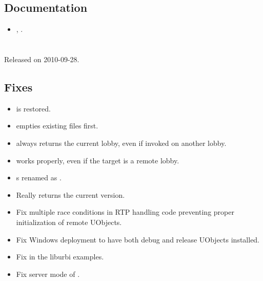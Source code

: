 \subsection{Documentation}
\begin{itemize}
\item {}, .
\end{itemize}

\section{}
Released on 2010-09-28.

\subsection{Fixes}
\begin{itemize}
\item {} is restored.
\item {} empties existing files first.
\item {} always returns the current lobby, even if
  invoked on another lobby.
\item {} works properly, even if the target is a
  remote lobby.
\item {}s renamed as .
\item {} Really returns the current version.
\item Fix multiple race conditions in RTP handling code preventing proper
  initialization of remote UObjects.
\item Fix Windows deployment to have both debug and release UObjects
  installed.
\item Fix  in the liburbi examples.
\item Fix server mode of .
\end{itemize}

